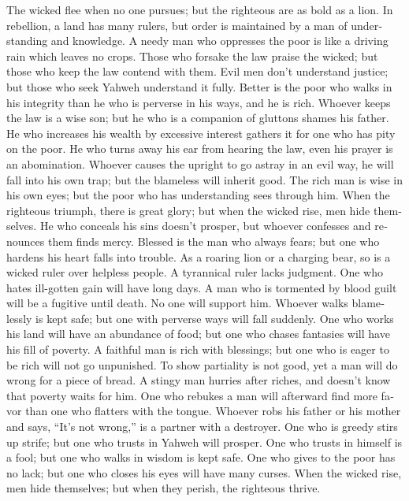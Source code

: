 \begin{paracol}{2}
\begin{otherlanguage}{english}
 The wicked flee when no one pursues; but the righteous
are as bold as a lion.  In rebellion, a land has many
rulers, but order is maintained by a man of understanding and knowledge.
 A needy man who oppresses the poor is like a driving rain
which leaves no crops.  Those who forsake the law praise
the wicked; but those who keep the law contend with them. 
Evil men don't understand justice; but those who seek Yahweh understand
it fully.  Better is the poor who walks in his integrity
than he who is perverse in his ways, and he is rich. 
Whoever keeps the law is a wise son; but he who is a companion of
gluttons shames his father.  He who increases his wealth
by excessive interest gathers it for one who has pity on the poor.
 He who turns away his ear from hearing the law, even his
prayer is an abomination.  Whoever causes the upright to
go astray in an evil way, he will fall into his own trap; but the
blameless will inherit good.  The rich man is wise in his
own eyes; but the poor who has understanding sees through him.
 When the righteous triumph, there is great glory; but
when the wicked rise, men hide themselves.  He who
conceals his sins doesn't prosper, but whoever confesses and renounces
them finds mercy.  Blessed is the man who always fears;
but one who hardens his heart falls into trouble.  As a
roaring lion or a charging bear, so is a wicked ruler over helpless
people.  A tyrannical ruler lacks judgment. One who hates
ill-gotten gain will have long days.  A man who is
tormented by blood guilt will be a fugitive until death. No one will
support him.  Whoever walks blamelessly is kept safe; but
one with perverse ways will fall suddenly.  One who works
his land will have an abundance of food; but one who chases fantasies
will have his fill of poverty.  A faithful man is rich
with blessings; but one who is eager to be rich will not go unpunished.
 To show partiality is not good, yet a man will do wrong
for a piece of bread.  A stingy man hurries after riches,
and doesn't know that poverty waits for him.  One who
rebukes a man will afterward find more favor than one who flatters with
the tongue.  Whoever robs his father or his mother and
says, ``It's not wrong,'' is a partner with a destroyer. 
One who is greedy stirs up strife; but one who trusts in Yahweh will
prosper.  One who trusts in himself is a fool; but one
who walks in wisdom is kept safe.  One who gives to the
poor has no lack; but one who closes his eyes will have many curses.
 When the wicked rise, men hide themselves; but when they
perish, the righteous thrive.


\end{otherlanguage}
\end{paracol}
